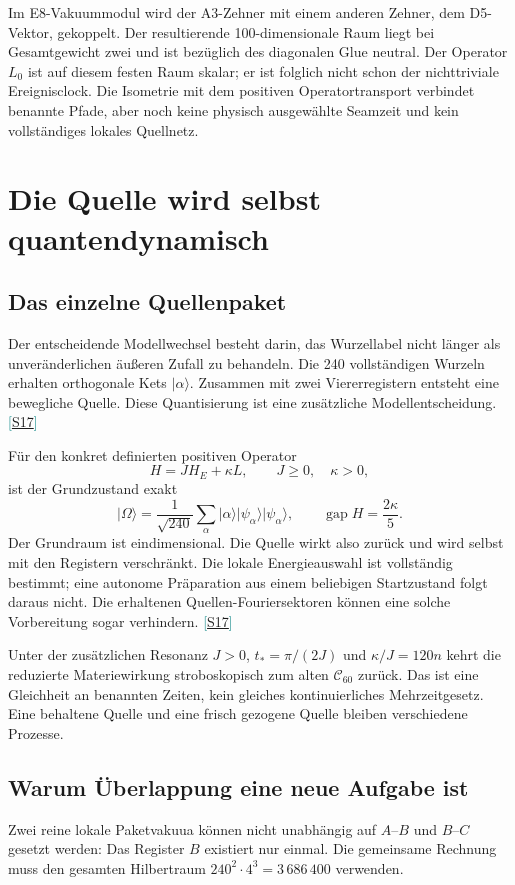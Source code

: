 \documentclass[11pt,a4paper,oneside,parskip=half,headings=normal,numbers=noenddot,bibliography=totoc]{scrreprt}
\newcommand{\ket}[1]{\lvert #1\rangle}
\newcommand{\gap}{\operatorname{gap}}
\newcommand{\src}[1]{\textcolor{teal}{\small[\hyperref[s:#1]{S#1}]}}
\begin{document}
Im E8-Vakuummodul wird der A3-Zehner mit einem anderen Zehner, dem D5-Vektor, gekoppelt. Der resultierende 100-dimensionale Raum liegt bei Gesamtgewicht zwei und ist bezüglich des diagonalen Glue neutral. Der Operator $L_0$ ist auf diesem festen Raum skalar; er ist folglich nicht schon der nichttriviale Ereignisclock. Die Isometrie mit dem positiven Operatortransport verbindet benannte Pfade, aber noch keine physisch ausgewählte Seamzeit und kein vollständiges lokales Quellnetz.

\chapter{Die Quelle wird selbst quantendynamisch}
\section{Das einzelne Quellenpaket}
Der entscheidende Modellwechsel besteht darin, das Wurzellabel nicht länger als unveränderlichen äußeren Zufall zu behandeln. Die 240 vollständigen Wurzeln erhalten orthogonale Kets $\ket\alpha$. Zusammen mit zwei Viererregistern entsteht eine bewegliche Quelle. Diese Quantisierung ist eine zusätzliche Modellentscheidung. \src{17}

Für den konkret definierten positiven Operator
\[
 H=JH_E+\kappa L,\qquad J\ge0,\quad\kappa>0,
\]
ist der Grundzustand exakt
\[
 \ket\Omega=\frac1{\sqrt{240}}\sum_\alpha
 \ket\alpha\ket{\psi_\alpha}\ket{\psi_\alpha},
 \qquad\gap H=\frac{2\kappa}5.
\]
Der Grundraum ist eindimensional. Die Quelle wirkt also zurück und wird selbst mit den Registern verschränkt. Die lokale Energieauswahl ist vollständig bestimmt; eine autonome Präparation aus einem beliebigen Startzustand folgt daraus nicht. Die erhaltenen Quellen-Fouriersektoren können eine solche Vorbereitung sogar verhindern. \src{17}

Unter der zusätzlichen Resonanz $J>0$, $t_*=\pi/(2J)$ und $\kappa/J=120n$ kehrt die reduzierte Materiewirkung stroboskopisch zum alten $\mathcal C_{60}$ zurück. Das ist eine Gleichheit an benannten Zeiten, kein gleiches kontinuierliches Mehrzeitgesetz. Eine behaltene Quelle und eine frisch gezogene Quelle bleiben verschiedene Prozesse.

\section{Warum Überlappung eine neue Aufgabe ist}
Zwei reine lokale Paketvakuua können nicht unabhängig auf $A$--$B$ und $B$--$C$ gesetzt werden: Das Register $B$ existiert nur einmal. Die gemeinsame Rechnung muss den gesamten Hilbertraum $240^2\cdot4^3=3\,686\,400$ verwenden.
\end{document}
